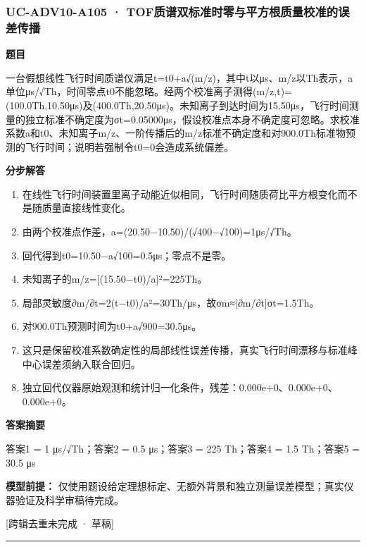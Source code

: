 \documentclass[UTF8,11pt,a4paper]{ctexart}
\begin{document}
\subsubsection*{UC-ADV10-A105 · TOF质谱双标准时零与平方根质量校准的误差传播}
\noindent\textbf{题目}\par
一台假想线性飞行时间质谱仪满足t=t0+a√(m/z)，其中t以μs、m/z以Th表示，a单位μs/√Th，时间零点t0不能忽略。经两个校准离子测得(m/z,t)=(100.0Th,10.50μs)及(400.0Th,20.50μs)。未知离子到达时间为15.50μs，飞行时间测量的独立标准不确定度为σt=0.05000μs，假设校准点本身不确定度可忽略。求校准系数a和t0、未知离子m/z、一阶传播后的m/z标准不确定度和对900.0Th标准物预测的飞行时间；说明若强制令t0=0会造成系统偏差。\par
\medskip\noindent\textbf{分步解答}
\begin{enumerate}
\item 在线性飞行时间装置里离子动能近似相同，飞行时间随质荷比平方根变化而不是随质量直接线性变化。
\item 由两个校准点作差，a=(20.50−10.50)/(√400−√100)=1μs/√Th。
\item 回代得到t0=10.50−a√100=0.5μs；零点不是零。
\item 未知离子的m/z=[(15.50−t0)/a]²=225Th。
\item 局部灵敏度∂m/∂t=2(t−t0)/a²=30Th/μs，故σm≈|∂m/∂t|σt=1.5Th。
\item 对900.0Th预测时间为t0+a√900=30.5μs。
\item 这只是保留校准系数确定性的局部线性误差传播，真实飞行时间漂移与标准峰中心误差须纳入联合回归。
\item 独立回代仪器原始观测和统计归一化条件，残差：0.000e+0、0.000e+0、0.000e+0。
\end{enumerate}
\noindent\textbf{答案摘要}\par
答案1 = 1 μs/√Th；答案2 = 0.5 μs；答案3 = 225 Th；答案4 = 1.5 Th；答案5 = 30.5 μs\par
\noindent\textbf{模型前提：}
仅使用题设给定理想标定、无额外背景和独立测量误差模型；真实仪器验证及科学审稿待完成。\par
\noindent\textcolor{red!65!black}{[跨辑去重未完成 · 草稿]} \par
\medskip\hrule\medskip
{}
\end{document}
